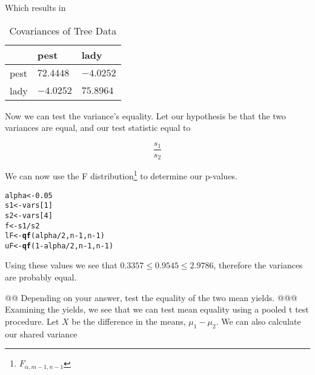 \documentclass[10pt]{article}\usepackage[]{graphicx}\usepackage[]{xcolor}
\makeatletter
\newcommand{\hlnum}[1]{\textcolor[rgb]{0.686,0.059,0.569}{#1}}%
\newcommand{\hlopt}[1]{\textcolor[rgb]{0,0,0}{#1}}%
\newcommand{\hlstd}[1]{\textcolor[rgb]{0.345,0.345,0.345}{#1}}%
\newcommand{\hlkwb}[1]{\textcolor[rgb]{0.69,0.353,0.396}{#1}}%
\newcommand{\hlkwd}[1]{\textcolor[rgb]{0.737,0.353,0.396}{\textbf{#1}}}%
\newenvironment{kframe}{%
 \def\at@end@of@kframe{}%
 \ifinner\ifhmode%
  \def\at@end@of@kframe{\end{minipage}}%
  \begin{minipage}{\columnwidth}%
 \fi\fi%
 \def\FrameCommand##1{\hskip\@totalleftmargin \hskip-\fboxsep
 \colorbox{shadecolor}{##1}\hskip-\fboxsep
     \hskip-\linewidth \hskip-\@totalleftmargin \hskip\columnwidth}%
 \MakeFramed {\advance\hsize-\width
   \@totalleftmargin\z@ \linewidth\hsize
   \@setminipage}}%
 {\par\unskip\endMakeFramed%
 \at@end@of@kframe}
\newenvironment{knitrout}{}{} %
\makeatother
\begin{document}
\begin{easylist}[enumerate]
    Which results in

    \begin{table}[H]
        \centering
        \begin{tabular}{|l|l|l|}
            \hline
            & {\ttfamily pest} & {\ttfamily lady}\\
            \hline
            {\ttfamily pest} & $72.4448$ & $-4.0252$\\
            \hline
            {\ttfamily lady} & $-4.0252$ & $75.8964$\\
            \hline
        \end{tabular}
        \caption{Covariances of Tree Data}
        \label{table:treevars}
    \end{table}

    Now we can test the variance's equality. Let our hypothesis be that the two variances are equal, and our test
    statistic equal to

    \[
        \frac{s_1}{s_2}
    \]

    We can now use the F distribution\footnote{$ F_{\alpha, m - 1, n - 1} $} to determine our p-values.

\begin{knitrout}
\color{fgcolor}\begin{kframe}
\begin{alltt}
             \hlstd{alpha} \hlkwb{<-} \hlnum{0.05}
             \hlstd{s1} \hlkwb{<-} \hlstd{vars[}\hlnum{1}\hlstd{]}
             \hlstd{s2} \hlkwb{<-} \hlstd{vars[}\hlnum{4}\hlstd{]}
             \hlstd{f} \hlkwb{<-} \hlstd{s1} \hlopt{/} \hlstd{s2}
             \hlstd{lF} \hlkwb{<-} \hlkwd{qf}\hlstd{(alpha} \hlopt{/} \hlnum{2}\hlstd{, n} \hlopt{-} \hlnum{1}\hlstd{, n} \hlopt{-} \hlnum{1}\hlstd{)}
             \hlstd{uF} \hlkwb{<-} \hlkwd{qf}\hlstd{(}\hlnum{1} \hlopt{-} \hlstd{alpha} \hlopt{/} \hlnum{2}\hlstd{, n} \hlopt{-} \hlnum{1}\hlstd{, n} \hlopt{-} \hlnum{1}\hlstd{)}
\end{alltt}
\end{kframe}
\end{knitrout}


    Using these values we see that $0.3357 \le 0.9545 \le 2.9786$, therefore the variances are probably
    equal.

    @@ Depending on your answer, test the equality of the two mean yields.
    @@@ Examining the yields, we see that we can test mean equality using a pooled t test procedure. Let $X$ be the
    difference in the means, $\mu_1 - \mu_2$. We can also calculate our shared variance


\end{easylist}
\end{document}
